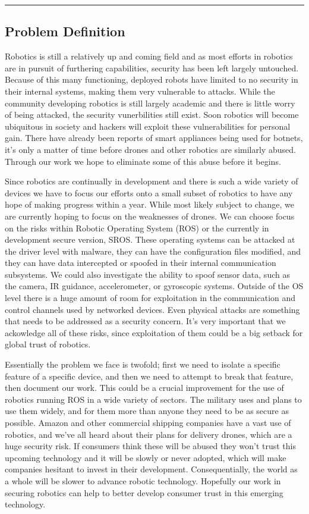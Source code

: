 \documentclass[IEEEtran,letterpaper,10pt,titlepage,draftclsnofoot,onecolumn]{article}
\begin{document}
\hrule\vspace{5mm}
\subsection*{Problem Definition}
Robotics is still a relatively up and coming field and as most efforts in robotics are in pursuit of furthering capabilities, security has been left largely untouched. 
Because of this many functioning, deployed robots have limited to no security in their internal systems, making them very vulnerable to attacks.
While the community developing robotics is still largely academic and there is little worry of being attacked, the security vunerbilities still exist. 
Soon robotics will become ubiquitous in society and hackers will exploit these vulnerabilities for personal gain.
There have already been reports of smart appliances being used for botnets, it's only a matter of time before drones and other robotics are similarly abused.
Through our work we hope to eliminate some of this abuse before it begins.

Since robotics are continually in development and there is such a wide variety of devices we have to focus our efforts onto a small subset of robotics to have any hope of making progress within a year. 
While most likely subject to change, we are currently hoping to focus on the weaknesses of drones.
We can choose focus on the risks within Robotic Operating System (ROS) or the currently in development secure version, SROS.
These operating systems can be attacked at the driver level with malware, they can have the configuration files modified, and they can have data intercepted or spoofed in their internal communication subsystems.
We could also investigate the ability to spoof sensor data, such as the camera, IR guidance, accelerometer, or gyroscopic systems. 
Outside of the OS level there is a huge amount of room for exploitation in the communication and control channels used by networked devices. 
Even physical attacks are something that needs to be addressed as a security concern.
It's very important that we ackowledge all of these risks, since exploitation of them could be a big setback for global trust of robotics.

Essentially the problem we face is twofold; first we need to isolate a specific feature of a specific device, and then we need to attempt to break that feature, then document our work.
This could be a crucial improvement for the use of robotics running ROS in a wide variety of sectors.
The military uses and plans to use them widely, and for them more than anyone they need to be as secure as possible.
Amazon and other commercial shipping companies have a vast use of robotics, and we've all heard about their plans for delivery drones, which are a huge security risk.
If consumers think these will be abused they won't trust this upcoming technology and it will be slowly or never adopted, which will make companies hesitant to invest in their development.
Consequentially, the world as a whole will be slower to advance robotic technology.
Hopefully our work in securing robotics can help to better develop consumer trust in this emerging technology. 
\end{document}
